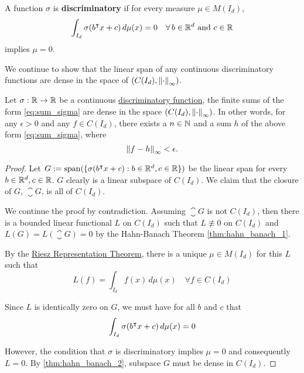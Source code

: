 \begin{definition}
    \label{def:dis_func}
    A function $\sigma$ is \textbf{discriminatory} if for every measure $\mu \in
    M(I_d)$,
    \begin{equation}
        \int_{I_d} \sigma(b{}^{\intercal} x + c) \,d\mu(x) = 0 \quad 
        \forall \,b \in \mathbb{R}^d \textnormal{ and } c \in \mathbb{R}
    \end{equation}
    implies $\mu = 0$.
\end{definition}

We continue to show that the linear span of any continuous discriminatory
functions are dense in the space of $(C(I_d), \left\| \cdot \right\|_{\infty})$.

\begin{theorem}
    Let $\sigma: \mathbb{R} \to \mathbb{R}$ be a continuous
    \hyperref[def:dis_func]{discriminatory function}, the finite sums of the
    form \eqref{eq:sum_sigma} are dense in the space $(C(I_d),
    \left\| \cdot \right\|_{\infty})$. In other words, for any $\epsilon > 0$ and any $f
    \in C(I_d)$, there exists a $n \in \mathbb{N}$ and a sum $h$ of the above form
    \eqref{eq:sum_sigma}, where
    \begin{equation}
        \left\| f - h \right\|_{\infty} < \epsilon.
    \end{equation}
\end{theorem}

\begin{proof}
    Let $G := \operatorname{span}(\{\sigma(b{}^{\intercal} x + c): b \in \mathbb{R}^d, c \in \mathbb{R} \})$ be the linear
    span for every $b\in\mathbb{R}^d, c\in\mathbb{R}$. $G$ clearly is a linear subspace of
    $C(I_d)$. We claim that the closure of $G$, $\closure{G}$, is all of
    $C(I_d)$.

    We continue the proof by contradiction. Assuming $\closure{G}$ is not
    $C(I_d)$, then there is a bounded linear functional $L$ on $C(I_d)$ such
    that $L \not\equiv 0$ on $C(I_d)$ and $L(G) = L(\closure{G}) = 0$ by the
    Hahn-Banach Theorem \ref{thm:hahn_banach_1}.

    By the \hyperref[thm:riesz_rep]{Riesz Representation Theorem}, there is a
    unique $\mu \in M(I_d)$ for this $L$ such that
    \begin{equation}
        L(f) = \int_{I_d} f(x) \,d\mu(x) \quad \forall f \in C(I_d)
    \end{equation}

    Since $L$ is identically zero on $G$, we must have for all $b$ and $c$ that
    \begin{equation}
        \int_{I_d} \sigma(b{}^{\intercal} x + c) \,d\mu(x) = 0
    \end{equation}

    However, the condition that $\sigma$ is discriminatory implies $\mu = 0$ and
    consequently $L = 0$. By \eqref{thm:hahn_banach_2}, subspace $G$ must be
    dense in $C(I_d)$.
\end{proof}

